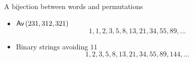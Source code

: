 \begin{frame}{A bijection between words and permutations}
    \begin{itemize}
    \item $\textsf{Av}\left(231,312,321\right)$
    \[1, 1, 2, 3, 5, 8, 13, 21, 34, 55, 89, \dotsc\]
    \item Binary strings avoiding $11$
    \[1, 2, 3, 5, 8, 13, 21, 34, 55, 89, 144, \dotsc\]
    \end{itemize}
    \begin{figure}
        \centering
        
    \end{figure}
\end{frame}